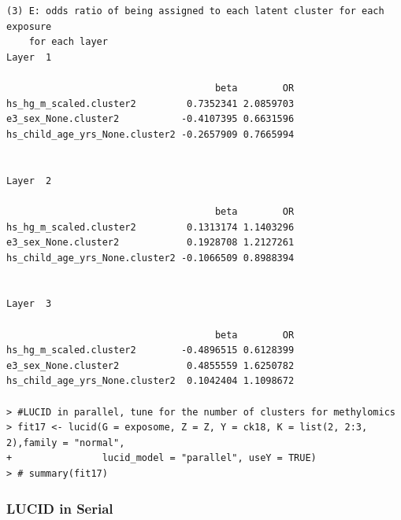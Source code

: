 \begin{verbatim}
 

(3) E: odds ratio of being assigned to each latent cluster for each exposure 
    for each layer 
Layer  1 
 
                                     beta        OR
hs_hg_m_scaled.cluster2         0.7352341 2.0859703
e3_sex_None.cluster2           -0.4107395 0.6631596
hs_child_age_yrs_None.cluster2 -0.2657909 0.7665994

 
Layer  2 
 
                                     beta        OR
hs_hg_m_scaled.cluster2         0.1313174 1.1403296
e3_sex_None.cluster2            0.1928708 1.2127261
hs_child_age_yrs_None.cluster2 -0.1066509 0.8988394

 
Layer  3 
 
                                     beta        OR
hs_hg_m_scaled.cluster2        -0.4896515 0.6128399
e3_sex_None.cluster2            0.4855559 1.6250782
hs_child_age_yrs_None.cluster2  0.1042404 1.1098672

> #LUCID in parallel, tune for the number of clusters for methylomics
> fit17 <- lucid(G = exposome, Z = Z, Y = ck18, K = list(2, 2:3, 2),family = "normal",
+                lucid_model = "parallel", useY = TRUE)
> # summary(fit17)
\end{verbatim}

\subsubsection{LUCID in Serial}\label{sec_serial}

